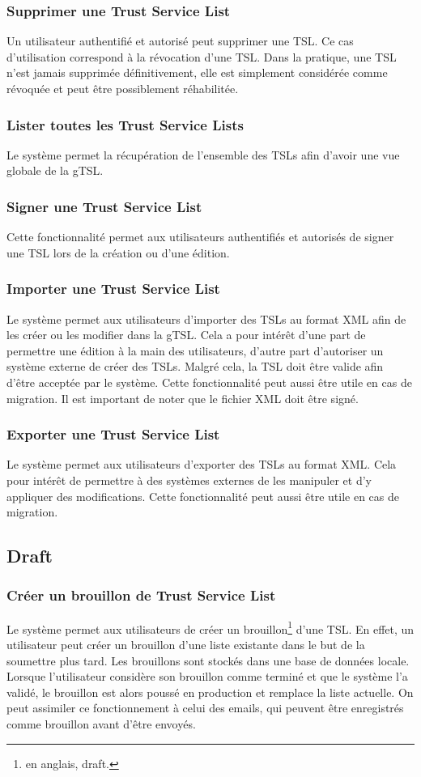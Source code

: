 \documentclass{tnreport}
\begin{document}
\subsubsection{Supprimer une Trust Service List}
Un utilisateur authentifié et autorisé peut supprimer une TSL. Ce cas d'utilisation correspond à la révocation d'une TSL. Dans la pratique, une TSL n'est jamais supprimée définitivement, elle est simplement considérée comme révoquée et peut être possiblement réhabilitée.
\subsubsection{Lister toutes les Trust Service Lists}
Le système permet la récupération de l'ensemble des TSLs afin d'avoir une vue globale de la gTSL.
\subsubsection{Signer une Trust Service List}
Cette fonctionnalité permet aux utilisateurs authentifiés et autorisés de signer une TSL lors de la création ou d'une édition.
\subsubsection{Importer une Trust Service List}
Le système permet aux utilisateurs d'importer des TSLs au format XML afin de les créer ou les modifier dans la gTSL. Cela a pour intérêt d'une part de permettre une édition à la main des utilisateurs, d'autre part d'autoriser un système externe de créer des TSLs. Malgré cela, la TSL doit être valide afin d'être acceptée par le système. Cette fonctionnalité peut aussi être utile en cas de migration. Il est important de noter que le fichier XML doit être signé.
\subsubsection{Exporter une Trust Service List}
Le système permet aux utilisateurs d'exporter des TSLs au format XML. Cela pour intérêt de permettre à des systèmes externes de les manipuler et d'y appliquer des modifications. Cette fonctionnalité peut aussi être utile en cas de migration.

\subsection{Draft}
\subsubsection{Créer un brouillon de Trust Service List}
Le système permet aux utilisateurs de créer un brouillon\footnote{en anglais, draft.} d'une TSL. En effet, un utilisateur peut créer un brouillon d'une liste existante dans le but de la soumettre plus tard. Les brouillons sont stockés dans une base de données locale. Lorsque l'utilisateur considère son brouillon comme terminé et que le système l'a validé, le brouillon est alors poussé en production et remplace la liste actuelle. On peut assimiler ce fonctionnement à celui des emails, qui peuvent être enregistrés comme brouillon avant d'être envoyés.
\end{document}
